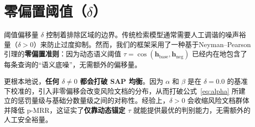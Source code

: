 \documentclass[12pt,a4paper]{article}
\begin{document}
\section{零偏置阈值（$\delta$）}

阈值偏移量 $\delta$ 控制着排除区域的边界。传统检索模型通常需要人工调谐的噪声裕量（$\delta > 0$）来防止过度抑制。然而，我们的框架采用了一种基于Neyman--Pearson引理的\textbf{零偏置准则}：因为动态语义阈值 $\tau = \cos(\mathbf{h}_{\text{base}}, \mathbf{h}_{\text{neg}})$ 已经内在地包含了每条查询的“语义底噪”，无需额外的偏移量。

更根本地说，\textbf{任何 $\delta \neq 0$ 都会打破 SAP 均衡}。因为 $\alpha$ 和 $\beta$ 是在 $\delta = 0.0$ 的基准下校准的，引入非零偏移会改变风险文档的分布，从而打破公式~\eqref{eq:alpha} 所建立的惩罚量级与基础分数量级之间的对称性。经验上，$\delta > 0$ 会收缩风险文档群体并降低 p-MRR，这证实了\textbf{仅靠动态锚定 $\tau$} 就能提供最优的判别能力，无需额外的人工安全裕量。
\end{document}
